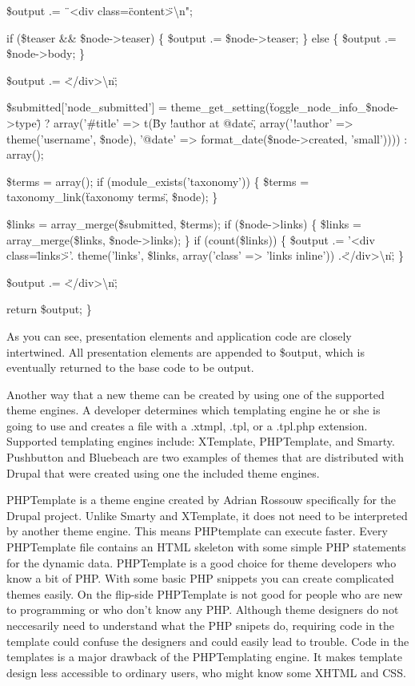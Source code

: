 \documentclass[a4paper,12pt]{report}
\begin{document}
  \$output .= \"\ <div class=\"content\">\textbackslash n";

  if (\$teaser \&\& \$node->teaser) \{
    \$output .= \$node->teaser;
  \}
  else \{
    \$output .= \$node->body;
  \}

  \$output .= \" </div>\textbackslash n\";

  \$submitted['node\_submitted'] = theme\_get\_setting(\"toggle\_node\_info\_\$node->type\") ? array('\#title' => t(\"By !author at @date\", array('!author' => theme('username', \$node), '@date' => format\_date(\$node->created, 'small')))) : array();

  \$terms = array();
  if (module\_exists('taxonomy')) \{
    \$terms = taxonomy\_link(\"taxonomy terms\", \$node);
  \}

  \$links = array\_merge(\$submitted, \$terms);
  if (\$node->links) \{
    \$links = array\_merge(\$links, \$node->links);
  \}
  if (count(\$links)) \{
    \$output .= '<div class=\"links\">'. theme('links', \$links, array('class' => 'links inline')) .\"</div>\textbackslash n\";
  \}

  \$output .= \"</div>\textbackslash n\";

  return \$output;
\} 


As you can see, presentation elements and application code are closely intertwined. 
All presentation elements are appended to \$output, which is eventually returned to the base code to be output.


Another way that a new theme can be created by using one of the supported theme engines. 
A developer determines which templating engine he or she is going to use and creates a file with a .xtmpl, .tpl, or a .tpl.php extension. 
Supported templating engines include: XTemplate, PHPTemplate, and Smarty. 
Pushbutton and Bluebeach are two examples of themes that are distributed with Drupal that were created using one the included theme engines. 


PHPTemplate is a theme engine created by Adrian Rossouw specifically for the Drupal project. 
Unlike Smarty and XTemplate, it does not need to be interpreted by another theme engine. 
This means PHPtemplate can execute faster. 
Every PHPTemplate file contains an HTML skeleton with some simple PHP statements for the dynamic data. 
PHPTemplate is a good choice for theme developers who know a bit of PHP. With some basic PHP snippets you can create complicated themes easily. 
On the flip-side PHPTemplate is not good for people who are new to programming or who don't know any PHP. 
Although theme designers do not neccesarily need to understand what the PHP snipets do, requiring code in the template could confuse the designers and could easily lead to trouble. 
Code in the templates is a major drawback of the PHPTemplating engine. 
It makes template design less accessible to ordinary users, who might know some XHTML and CSS. 
\end{document}
